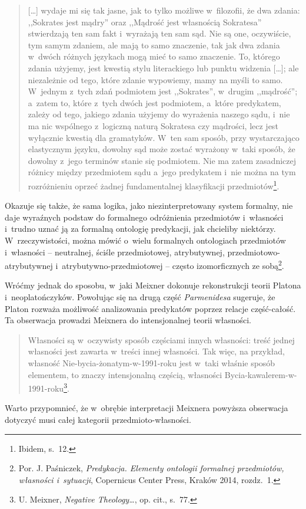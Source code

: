 \begin{quote}
[\ldots] wydaje mi się tak jasne, jak to tylko możliwe w~filozofii, że dwa zdania: ,,Sokrates jest mądry'' oraz ,,Mądrość jest własnością Sokratesa'' stwierdzają ten sam fakt i~wyrażają ten sam sąd. Nie są one, oczywiście, tym samym zdaniem, ale mają to samo znaczenie, tak jak dwa zdania w~dwóch różnych językach mogą mieć to samo znaczenie. To, którego zdania użyjemy, jest kwestią stylu literackiego lub punktu widzenia [\ldots]; ale niezależnie od tego, które zdanie wypowiemy, mamy na myśli to samo. W~jednym z~tych zdań podmiotem jest ,,Sokrates'', w~drugim ,,mądrość''; a~zatem to, które z~tych dwóch jest podmiotem, a~które predykatem, zależy od tego, jakiego zdania użyjemy do wyrażenia naszego sądu, i~nie ma nic wspólnego z~logiczną naturą Sokratesa czy mądrości, lecz jest wyłącznie kwestią dla gramatyków. W~ten sam sposób, przy wystarczająco elastycznym języku, dowolny sąd może zostać wyrażony w~taki sposób, że dowolny z~jego terminów stanie się podmiotem. Nie ma zatem zasadniczej różnicy między przedmiotem sądu a~jego predykatem i~nie można na tym rozróżnieniu oprzeć żadnej fundamentalnej klasyfikacji przedmiotów\footnote{Ibidem, s.~12.}.
\end{quote}
Okazuje się także, że sama logika, jako niezinterpretowany system formalny, nie daje wyraźnych podstaw do formalnego odróżnienia przedmiotów i~własności i~trudno uznać ją za formalną ontologię predykacji, jak chcieliby niektórzy. W~rzeczywistości, można mówić o~wielu formalnych ontologiach przedmiotów i~własności -- neutralnej, ściśle przedmiotowej, atrybutywnej, przedmiotowo-atrybutywnej i~atrybutywno-przedmiotowej -- często izomorficznych ze sobą\footnote{Por. J. Paśniczek, \textit{Predykacja. Elementy ontologii formalnej przedmiotów, własności i~sytuacji}, Copernicus Center Press, Kraków 2014, rozdz.~1.}.

Wróćmy jednak do sposobu, w~jaki Meixner dokonuje rekonstrukcji teorii Platona i~neoplatończyków. Powołując się na drugą część \textit{Parmenidesa} sugeruje, że Platon rozważa możliwość analizowania predykatów poprzez relacje część-całość. Ta obserwacja prowadzi Meixnera do intensjonalnej teorii własności.

\begin{quote}
Własności są w~oczywisty sposób częściami innych własności: treść jednej własności jest zawarta w~treści innej własności. Tak więc, na przykład, własność Nie-bycia-żonatym-w-1991-roku jest w~taki właśnie sposób elementem, to znaczy intensjonalną częścią, własności Bycia-kawalerem-w-1991-roku\footnote{U. Meixner, \textit{Negative Theology\ldots}, op. cit., s.~77.}.
\end{quote}
Warto przypomnieć, że w~obrębie interpretacji Meixnera powyższa obserwacja dotyczyć musi całej kategorii przedmioto-własności.

